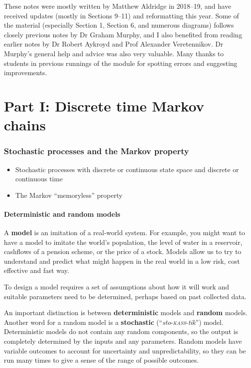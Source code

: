 \documentclass[
  a4paper,
]{article}
\providecommand{\tightlist}{%
  \setlength{\itemsep}{0pt}\setlength{\parskip}{0pt}}
\theoremstyle{definition}
\theoremstyle{definition}
\theoremstyle{definition}
\theoremstyle{remark}
\begin{document}
These notes were mostly written by Matthew Aldridge in 2018--19, and have received updates (mostly in Sections 9--11) and reformatting this year. Some of the material (especially Section 1, Section 6, and numerous diagrams) follows closely previous notes by Dr Graham Murphy, and I also benefited from reading earlier notes by Dr Robert Aykroyd and Prof Alexander Veretennikov. Dr Murphy's general help and advice was also very valuable. Many thanks to students in previous runnings of the module for spotting errors and suggesting improvements.

\hypertarget{part-part-i-discrete-time-markov-chains}{%
\part*{Part I: Discrete time Markov chains}\label{part-part-i-discrete-time-markov-chains}}

\hypertarget{S01-stochastic-processes}{%
\section{Stochastic processes and the Markov property}\label{S01-stochastic-processes}}

\begin{itemize}
\tightlist
\item
  Stochastic processes with discrete or continuous state space and discrete or continuous time
\item
  The Markov ``memoryless'' property
\end{itemize}

\hypertarget{models}{%
\subsection{Deterministic and random models}\label{models}}

A \textbf{model} is an imitation of a real-world system. For example, you might want to have a model to imitate the world's population, the level of water in a reservoir, cashflows of a pension scheme, or the price of a stock. Models allow us to try to understand and predict what might happen in the real world in a low risk, cost effective and fast way.

To design a model requires a set of assumptions about how it will work and suitable parameters need to be determined, perhaps based on past collected data.

An important distinction is between \textbf{deterministic} models and \textbf{random} models. Another word for a random model is a \textbf{stochastic} (``\emph{sto}-\textsc{\emph{kass}}-\emph{tik}'') model. Deterministic models do not contain any random components, so the output is completely determined by the inputs and any parameters. Random models have variable outcomes to account for uncertainty and unpredictability, so they can be run many times to give a sense of the range of possible outcomes.
\end{document}
